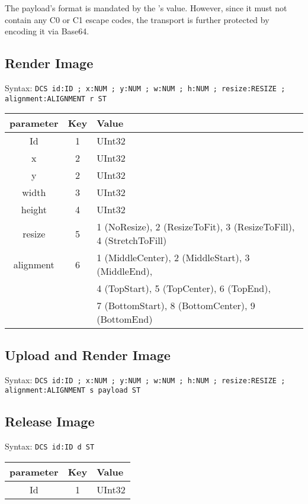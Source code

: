 \documentclass{article}
\newcommand{\code}[1]{\colorbox{light-gray}{\texttt{#1}}}
\begin{document}
The payload's format is mandated by the 's value. However, since it must not contain
any C0 or C1 escape codes, the transport is further protected by encoding it via Base64.

\subsection{Render Image}

Syntax: \code{DCS id:ID ; x:NUM ; y:NUM ; w:NUM ; h:NUM ; resize:RESIZE ; alignment:ALIGNMENT r ST}

\begin{tabular}{ |c|c|l| }
    \hline
    parameter   & Key & Value \\
    \hline
    Id          & 1   & UInt32 \\
    x           & 2   & UInt32 \\
    y           & 2   & UInt32 \\
    width       & 3   & UInt32 \\
    height      & 4   & UInt32 \\
    resize      & 5   & 1 (NoResize), 2 (ResizeToFit), 3 (ResizeToFill), 4 (StretchToFill) \\
    alignment   & 6   & 1 (MiddleCenter), 2 (MiddleStart), 3 (MiddleEnd), \\
                &     & 4 (TopStart), 5 (TopCenter), 6 (TopEnd), \\
                &     & 7 (BottomStart), 8 (BottomCenter), 9 (BottomEnd) \\
    \hline
\end{tabular}

\subsection{Upload and Render Image}

Syntax: \code{DCS id:ID ; x:NUM ; y:NUM ; w:NUM ; h:NUM ; resize:RESIZE ; alignment:ALIGNMENT s payload ST}

\subsection{Release Image}

Syntax: \code{DCS id:ID d ST}

\begin{tabular}{ |c|c|l| }
    \hline
    parameter   & Key & Value \\
    \hline
    Id          & 1   & UInt32 \\
    \hline
\end{tabular}
\end{document}
